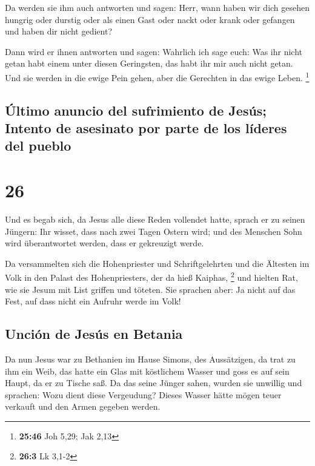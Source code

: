  Da werden sie ihm auch antworten und sagen: Herr, wann
haben wir dich gesehen hungrig oder durstig oder als einen Gast oder
nackt oder krank oder gefangen und haben dir nicht gedient?

 Dann wird er ihnen antworten und sagen: Wahrlich ich
sage euch: Was ihr nicht getan habt einem unter diesen Geringsten, das
habt ihr mir auch nicht getan.  Und sie werden in die
ewige Pein gehen, aber die Gerechten in das ewige Leben. \footnote{\textbf{25:46}
  Joh 5,29; Jak 2,13}

\hypertarget{uxfaltimo-anuncio-del-sufrimiento-de-jesuxfas-intento-de-asesinato-por-parte-de-los-luxedderes-del-pueblo}{%
\subsection{Último anuncio del sufrimiento de Jesús; Intento de
asesinato por parte de los líderes del
pueblo}\label{uxfaltimo-anuncio-del-sufrimiento-de-jesuxfas-intento-de-asesinato-por-parte-de-los-luxedderes-del-pueblo}}

\hypertarget{section-25}{%
\section{26}\label{section-25}}

 Und es begab sich, da Jesus alle diese Reden vollendet
hatte, sprach er zu seinen Jüngern:  Ihr wisset, dass nach
zwei Tagen Ostern wird; und des Menschen Sohn wird überantwortet werden,
dass er gekreuzigt werde.

 Da versammelten sich die Hohenpriester und
Schriftgelehrten und die Ältesten im Volk in den Palast des
Hohenpriesters, der da hieß Kaiphas, \footnote{\textbf{26:3} Lk 3,1-2}
 und hielten Rat, wie sie Jesum mit List griffen und
töteten.  Sie sprachen aber: Ja nicht auf das Fest, auf
dass nicht ein Aufruhr werde im Volk!

\hypertarget{unciuxf3n-de-jesuxfas-en-betania}{%
\subsection{Unción de Jesús en
Betania}\label{unciuxf3n-de-jesuxfas-en-betania}}

 Da nun Jesus war zu Bethanien im Hause Simons, des
Aussätzigen,  da trat zu ihm ein Weib, das hatte ein Glas
mit köstlichem Wasser und goss es auf sein Haupt, da er zu Tische saß.
 Da das seine Jünger sahen, wurden sie unwillig und
sprachen: Wozu dient diese Vergeudung?  Dieses Wasser
hätte mögen teuer verkauft und den Armen gegeben werden.

